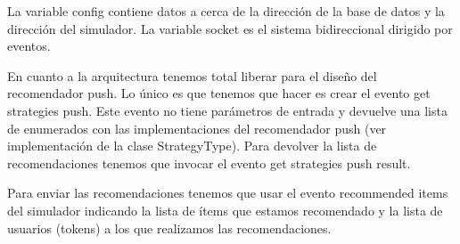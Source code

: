 La variable config contiene datos a cerca de la dirección de la base de datos y la dirección del simulador. La variable socket es el sistema bidireccional dirigido por eventos. 

En cuanto a la arquitectura tenemos total liberar para el diseño del recomendador push. Lo único es que tenemos que hacer es crear el evento get strategies push. Este evento no tiene parámetros de entrada y devuelve una lista de enumerados con las implementaciones del recomendador push (ver implementación de la clase StrategyType). Para devolver la lista de recomendaciones tenemos que invocar el evento get strategies push result.

Para enviar las recomendaciones tenemos que usar el evento recommended items del simulador indicando la lista de ítems que estamos recomendado y la lista de usuarios (tokens) a los que realizamos las recomendaciones.
